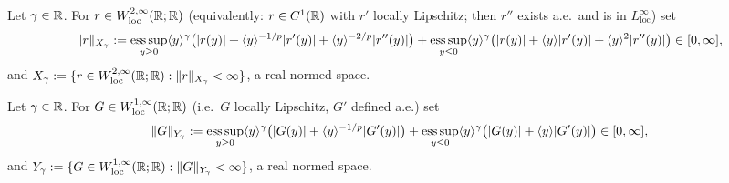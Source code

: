 \begin{definition}
  \label{def:X_gamma}
  Let $\gamma\in\mathbb{R}$. For $r\in W^{2,\infty}_{\mathrm{loc}}(\mathbb{R};\mathbb{R})$ (equivalently: $r\in C^1(\mathbb{R})$ with $r'$
  locally Lipschitz; then $r''$ exists a.e.\ and is in $L^\infty_{\mathrm{loc}}$) set
  \[
    \|r\|_{X_\gamma}:=\operatorname*{ess\,sup}_{y\ge0}\langle y \rangle^\gamma\bigl(|r(y)|+\langle y \rangle^{-1/p}|r'(y)|+\langle y \rangle^{-2/p}|r''(y)|\bigr)
    +\operatorname*{ess\,sup}_{y\le0}\langle y \rangle^\gamma\bigl(|r(y)|+\langle y \rangle|r'(y)|+\langle y \rangle^{2}|r''(y)|\bigr)\in[0,\infty],
  \]
  and $X_\gamma:=\{r\in W^{2,\infty}_{\mathrm{loc}}(\mathbb{R};\mathbb{R}):\|r\|_{X_\gamma}<\infty\}$, a real normed space.
\end{definition}

\begin{definition}
  \label{def:Y_gamma}
  Let $\gamma\in\mathbb{R}$. For $G\in W^{1,\infty}_{\mathrm{loc}}(\mathbb{R};\mathbb{R})$ (i.e.\ $G$ locally Lipschitz, $G'$ defined a.e.) set
  \[
    \|G\|_{Y_\gamma}:=\operatorname*{ess\,sup}_{y\ge0}\langle y \rangle^\gamma\bigl(|G(y)|+\langle y \rangle^{-1/p}|G'(y)|\bigr)
    +\operatorname*{ess\,sup}_{y\le0}\langle y \rangle^\gamma\bigl(|G(y)|+\langle y \rangle|G'(y)|\bigr)\in[0,\infty],
  \]
  and $Y_\gamma:=\{G\in W^{1,\infty}_{\mathrm{loc}}(\mathbb{R};\mathbb{R}):\|G\|_{Y_\gamma}<\infty\}$, a real normed space.
\end{definition}

